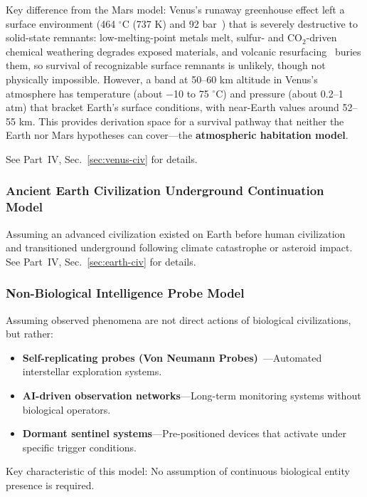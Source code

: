 \documentclass[aps,prd,twocolumn,superscriptaddress,nofootinbib]{revtex4-2}
\begin{document}
Key difference from the Mars model: Venus's runaway greenhouse effect left a surface environment (464 $^{\circ}$C (737 K) and 92 bar~\cite{NASA_Venus_Fact}) that is severely destructive to solid-state remnants: low-melting-point metals melt, sulfur- and CO$_{2}$-driven chemical weathering degrades exposed materials, and volcanic resurfacing~\cite{Strom1994} buries them, so survival of recognizable surface remnants is unlikely, though not physically impossible. However, a band at 50--60 km altitude in Venus's atmosphere has temperature (about $-$10 to 75 $^{\circ}$C) and pressure (about 0.2--1 atm) that bracket Earth's surface conditions, with near-Earth values around 52--55 km. This provides derivation space for a survival pathway that neither the Earth nor Mars hypotheses can cover---the \textbf{atmospheric habitation model}.

See Part~IV, Sec.~\ref{sec:venus-civ} for details.

\subsubsection{Ancient Earth Civilization Underground Continuation Model}\label{sec:earth-remnant}

Assuming an advanced civilization existed on Earth before human civilization and transitioned underground following climate catastrophe or asteroid impact. See Part~IV, Sec.~\ref{sec:earth-civ} for details.

\subsubsection{Non-Biological Intelligence Probe Model}\label{sec:non-bio}

Assuming observed phenomena are not direct actions of biological civilizations, but rather:

\begin{itemize}
  \item \textbf{Self-replicating probes (Von Neumann Probes)}~\cite{Freitas1980}---Automated interstellar exploration systems.
  \item \textbf{AI-driven observation networks}---Long-term monitoring systems without biological operators.
  \item \textbf{Dormant sentinel systems}---Pre-positioned devices that activate under specific trigger conditions.
\end{itemize}

Key characteristic of this model: No assumption of continuous biological entity presence is required.
\end{document}
